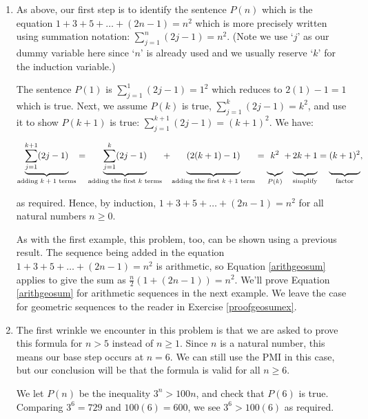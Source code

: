 \documentclass{ximera}
\begin{document}
\begin{example}
\begin{enumerate}
\item  As above, our first step is to identify the sentence $P(n)$ which is the equation $1 + 3 + 5 + \ldots + (2n-1) = n^2$ which is more precisely written using summation notation: $\displaystyle{ \sum_{j=1}^{n} (2j-1) = n^2}$. (Note we use `$j$' as our dummy variable here since `$n$' is already used and we usually reserve `$k$' for the induction variable.)

The sentence $P(1)$ is $\displaystyle{ \sum_{j=1}^{1} (2j-1) = 1^2}$ which reduces to $2(1)-1 = 1$ which is true.  Next, we assume $P(k)$ is true, $\displaystyle{ \sum_{j=1}^{k} (2j-1) = k^2}$,   and use it to show $P(k+1)$ is true: $\displaystyle{ \sum_{j=1}^{k+1} (2j-1) = (k+1)^2}$.  We have: 

\[ \underbrace{\displaystyle{\sum_{j=1}^{k+1} (2j-1)}}_{\text{adding $k+1$ terms}}  = \underbrace{\displaystyle{\sum_{j=1}^{k} (2j-1)}}_{\text{adding the first $k$ terms}} + \underbrace{(2(k+1)-1) \vphantom{\displaystyle{\sum_{j=1}^{k+1}}}}_{\text{adding the first $k+1$ term}} = \underbrace{k^2 \vphantom{\displaystyle{\sum_{j=1}^{k+1}}}}_{\text{$P(k)$}}+ \underbrace{2k+1 \vphantom{\displaystyle{\sum_{j=1}^{k+1}}}}_{\text{simplify}} =\underbrace{(k+1)^2 \vphantom{\displaystyle{\sum_{j=1}^{k+1}}}}_{\text{factor}} , \]

as required.  Hence, by induction, $1 + 3 + 5 + \ldots + (2n-1) = n^2$ for all natural numbers $n \geq 0$.  

As with the first example, this problem, too, can be shown using a previous result.  The sequence being added in the equation $1 + 3 + 5 + \ldots + (2n-1)=n^2$ is arithmetic, so Equation \ref{arithgeosum} applies to give the sum as $\frac{n}{2} (1 + (2n-1)) = n^2$.  We'll prove Equation \ref{arithgeosum} for arithmetic sequences in the next example. We leave the case for geometric sequences to the reader in Exercise \ref{proofgeosumex}.

\item The first wrinkle we encounter in this problem is that we are asked to prove this formula for $n > 5$ instead of $n \geq 1$.  Since $n$ is a natural number, this means our base step occurs at $n=6$.  We can still use the PMI in this case, but our conclusion will be that the formula is valid for all $n \geq 6$.  

 

We let $P(n)$ be the inequality  $3^{n} > 100n$, and check that $P(6)$ is true. Comparing $3^6 =  729$ and $100(6) = 600$, we see $3^6 > 100(6)$ as required.  


\end{enumerate}
\end{example}
\end{document}
